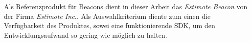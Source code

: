 Als Referenzprodukt für Beacons dient in dieser Arbeit das \textit{Estimote Beacon} von der Firma \textit{Estimote Inc.}. Als Auswahlkriterium diente zum einen die Verfügbarkeit des Produktes, sowei eine funktionierende SDK, um den Entwicklungsaufwand so gering wie möglich zu halten.
%
%
%
%
%
%
% 